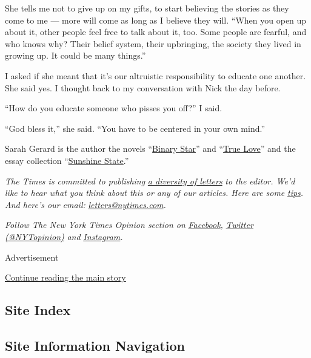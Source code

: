 She tells me not to give up on my gifts, to start believing the stories
as they come to me --- more will come as long as I believe they will.
``When you open up about it, other people feel free to talk about it,
too. Some people are fearful, and who knows why? Their belief system,
their upbringing, the society they lived in growing up. It could be many
things.''

I asked if she meant that it's our altruistic responsibility to educate
one another. She said yes. I thought back to my conversation with Nick
the day before.

``How do you educate someone who pisses you off?'' I said.

``God bless it,'' she said. ``You have to be centered in your own
mind.''

Sarah Gerard is the author the novels
``\href{https://www.twodollarradio.com/products/binary-star}{Binary
Star}'' and
``\href{https://www.harpercollins.com/products/true-love-sarah-gerard}{True
Love}'' and the essay collection
``\href{https://www.harpercollins.com/products/sunshine-state-sarah-gerard}{Sunshine
State}.''

\emph{The Times is committed to publishing}
\href{https://www.nytimes.com/2019/01/31/opinion/letters/letters-to-editor-new-york-times-women.html}{\emph{a
diversity of letters}} \emph{to the editor. We'd like to hear what you
think about this or any of our articles. Here are some}
\href{https://help.nytimes.com/hc/en-us/articles/115014925288-How-to-submit-a-letter-to-the-editor}{\emph{tips}}\emph{.
And here's our email:}
\href{mailto:letters@nytimes.com}{\emph{letters@nytimes.com}}\emph{.}

\emph{Follow The New York Times Opinion section on}
\href{https://www.facebook.com/nytopinion}{\emph{Facebook}}\emph{,}
\href{http://twitter.com/NYTOpinion}{\emph{Twitter (@NYTopinion)}}
\emph{and}
\href{https://www.instagram.com/nytopinion/}{\emph{Instagram}}\emph{.}

Advertisement

\protect\hyperlink{after-bottom}{Continue reading the main story}

\hypertarget{site-index}{%
\subsection{Site Index}\label{site-index}}

\hypertarget{site-information-navigation}{%
\subsection{Site Information
Navigation}\label{site-information-navigation}}

